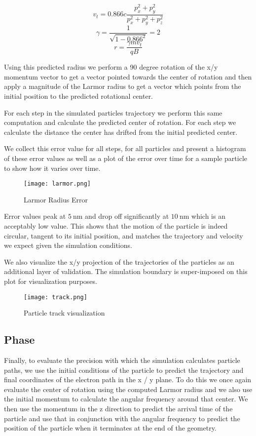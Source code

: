 \documentclass[12pt,letterpaper]{article}
\begin{document}
\[ v_{t} = 0.866c\frac{p_x^2 + p_y^2}{p_x^2 + p_y^2 + p_z^2} \]
\[ \gamma = \frac{1}{\sqrt{1 - 0.866^2}} = 2 \]
\[ r = \frac{\gamma mv_t}{qB}  \]

Using this predicted radius we perform a 90 degree rotation of the x/y momentum vector to get a vector pointed towards the center of rotation and then apply a magnitude of the Larmor radius to get a vector which points from the initial position to the predicted rotational center.

For each step in the simulated particles trajectory we perform this same computation and calculate the predicted center of rotation. For each step we calculate the distance the center has drifted from the initial predicted center. 

We collect this error value for all steps, for all particles and present a histogram of these error values as well as a plot of the error over time for a sample particle to show how it varies over time.

    \begin{figure}[H]
    \centering
    \texttt{[image: larmor.png]}
    \caption{Larmor Radius Error}
    \end{figure}
    

Error values peak at $5~$nm and drop off significantly at $10~$nm which is an acceptably low value. This shows that the motion of the particle is indeed circular, tangent to its initial position, and matches the trajectory and velocity we expect given the simulation conditions. 

We also visualize the x/y projection of the trajectories of the particles as an additional layer of validation. The simulation boundary is super-imposed on this plot for visualization purposes. 

    \begin{figure}[H]
    \centering
    \texttt{[image: track.png]}
    \caption{Particle track visualization}
    \end{figure}

\subsection{Phase}
    
Finally, to evaluate the precision with which the simulation calculates particle paths, we use the initial conditions of the particle to predict the trajectory and final coordinates of the electron path in the x / y plane. To do this we once again evaluate the center of rotation using the computed Larmor radius and we also use the initial momentum to calculate the angular frequency around that center. We then use the momentum in the z direction to predict the arrival time of the particle and use that in conjunction with the angular frequency to predict the position of the particle when it terminates at the end of the geometry. 
\end{document}
